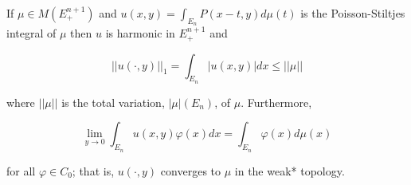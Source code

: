 \begin{theorem}
    If $\mu\in M(E_+^{n+1})$ and $u(x,y)=\int_{E_n}P(x-t,y)d\mu(t)$ is the Poisson-Stiltjes integral of $\mu$ then $u$ is harmonic in $E_+^{n+1}$ and 

    \begin{equation}
        ||u(\cdot,y)||_1=\int_{E_n}|u(x,y)|dx\leq||\mu||
    \end{equation}

    \noindent where $||\mu||$ is the total variation, $|\mu|(E_n)$, of $\mu$. Furthermore,

    \begin{equation*}
        \lim_{y\rightarrow0}\int_{E_n}u(x,y)\varphi(x)dx=\int_{E_n}\varphi(x)d\mu(x)
    \end{equation*}

    \noindent for all $\varphi\in C_0$; that is, $u(\cdot,y)$ converges to $\mu$ in the weak* topology.
\end{theorem}